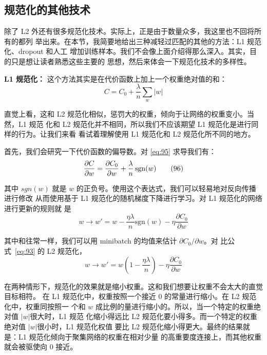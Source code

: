 \subsection{规范化的其他技术}

除了 L2 外还有很多规范化技术。实际上，正是由于数量众多，我这里也不回将所有的都列
举出来。在本节，我简要地给出三种减轻过匹配的其他的方法：L1 规范化、dropout 和人工
增加训练样本。我们不会像上面介绍得那么深入。其实，目的只是想让读者熟悉这些主要的
思想，然后来体会一下规范化技术的多样性。

\textbf{L1 规范化：} 这个方法其实是在代价函数上加上一个权重绝对值的和：
\begin{equation}
  C = C_0 + \frac{\lambda}{n} \sum_w |w|
  \label{eq:95}\tag{95}
\end{equation}

直觉上看，这和 L2 规范化相似，惩罚大的权重，倾向于让网络的权重变小。当然，L1 规范
化和 L2 规范化并不相同，所以我们不应该期望 L1 规范化是进行同样的行为。让我们来看
看试着理解使用 L1 规范化和 L2 规范化所不同的地方。

首先，我们会研究一下代价函数的偏导数。对 \eqref{eq:95} 求导我们有：
\begin{equation}
  \frac{\partial C}{\partial w} = \frac{\partial C_0}{\partial w}
  + \frac{\lambda}{n} \, {\rm sgn}(w)
  \label{eq:96}\tag{96}
\end{equation}

其中 $sgn(w)$ 就是 $w$ 的正负号。使用这个表达式，我们可以轻易地对反向传播进行修改
从而使用基于 L1 规范化的随机梯度下降进行学习。对 L1 规范化的网络进行更新的规则就
是
\begin{equation}
  w \rightarrow w' = w-\frac{\eta \lambda}{n} \mbox{sgn}(w) - \eta \frac{\partial
  C_0}{\partial w}
  \label{eq:97}\tag{97}
\end{equation}

其中和往常一样，我们可以用 minibatch 的均值来估计 $\partial C_0/\partial w$。对
比公式~\eqref{eq:93} 的 L2 规范化，
\begin{equation}
  w \rightarrow w' = w\left(1 - \frac{\eta \lambda}{n} \right)
  - \eta \frac{\partial C_0}{\partial w}
  \label{eq:98}\tag{98}
\end{equation}

在两种情形下，规范化的效果就是缩小权重。这和我们想要让权重不会太大的直觉目标相符。
在 L1 规范化中，权重按照一个接近 $0$ 的常量进行缩小。在 L2 规范化中，权重同按照一
个和 $w$ 成比例的量进行缩小的。所以，当一个特定的权重绝对值 $|w|$很大时，L1 规范
化缩小得远比 L2 规范化要小得多。而一个特定的权重绝对值 $|w|$很小时，L1 规范化权值
要比 L2 规范化缩小得更大。最终的结果就是：L1 规范化倾向于聚集网络的权重在相对少量
的高重要度连接上，而其他权重就会被驱使向 $0$ 接近。

